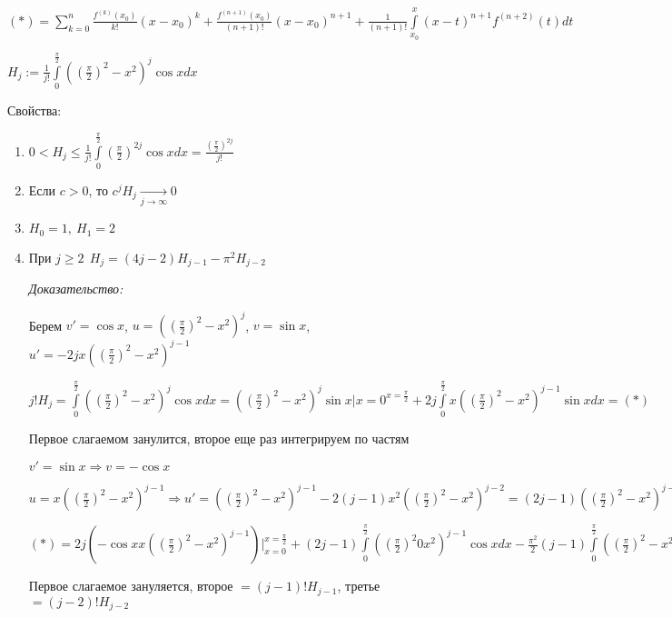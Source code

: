 \documentclass[12pt]{article}
\begin{document}
$(*) = \sum\limits_{k = 0}^n \frac{f^{(k)}(x_0)}{k!}(x - x_0)^k + \frac{f^{(n + 1)}(x_0)}{(n + 1)!}(x - x_0)^{n + 1} + \frac{1}{(n + 1)!} \int\limits_{x_0}^x (x - t)^{n + 1} f^{(n + 2)}(t)dt$

\begin{Example}{}
    $H_j := \frac{1}{j!} \int\limits_0^{\frac{\pi}{2}} ((\frac{\pi}{2})^2 - x^2)^j \cos{x}dx$

    \begin{theo}{Свойства:}
        \begin{enumerate}
            \item $0 < H_j \leq \frac{1}{j!} \int\limits_0^\frac{\pi}{2} (\frac{\pi}{2})^{2j} \cos{x}dx = \frac{(\frac{\pi}{2})^{2j}}{j!}$
            \item Если $c > 0$, то $c^jH_j \xrightarrow[j \to \infty]{} 0$
            \item $H_0 = 1,\ H_1 = 2$
            \item При $j \geq 2\ \ H_j = (4j - 2)H_{j - 1} - \pi^2H_{j - 2}$
            
            \textit{Доказательство:}

            Берем $v' = \cos{x}$, $u = ((\frac{\pi}{2})^2 - x^2)^j$, $v = \sin{x}$, $u' = -2jx((\frac{\pi}{2})^2 - x^2)^{j - 1}$

            $j!H_j = \int\limits_0^\frac{\pi}{2} ((\frac{\pi}{2})^2 - x^2)^j \cos{x}dx = ((\frac{\pi}{2})^2 - x^2)^j \sin{x}|{x = 0}^{x = \frac{\pi}{2}} + 2j \int\limits_0^\frac{\pi}{2} x((\frac{\pi}{2})^2 - x^2)^{j - 1} \sin{x}dx = (*)$

            Первое слагаемом занулится, второе еще раз интегрируем по частям

            $v' = \sin{x} \Rightarrow v = -\cos{x}$
            
            $u = x((\frac{\pi}{2})^2 - x^2)^{j - 1} \Rightarrow u' = ((\frac{\pi}{2})^2 - x^2)^{j - 1} - 2(j - 1)x^2((\frac{\pi}{2})^2 - x^2)^{j - 2} = (2j - 1)((\frac{\pi}{2})^2 - x^2)^{j - 1} - \frac{\pi^2}{2}(j - 1)((\frac{\pi}{2})^2 - x^2)^{j - 2}$

            $(*) = 2j(-\cos{x}x((\frac{\pi}{2})^2 - x^2)^{j - 1})|_{x = 0}^{x = \frac{\pi}{2}} + (2j - 1) \int\limits_{0}^\frac{\pi}{2} ((\frac{\pi}{2})^2 0 x^2)^{j - 1}\cos{x}dx - \frac{\pi^2}{2}(j - 1) \int\limits_0^\frac{\pi}{2} ((\frac{\pi}{2})^2 - x^2)^{j - 2}\cos{x}dx$

            Первое слагаемое зануляется, второе $= (j - 1)!H_{j - 1}$, третье $= (j - 2)!H_{j - 2}$


\end{enumerate}
\end{theo}
\end{Example}
\end{document}
